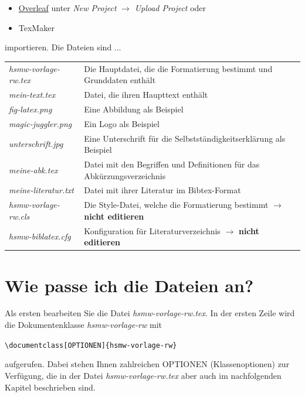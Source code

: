 \begin{itemize}
 \item \href{https://www.overleaf.com}{Overleaf} unter \textit{New Project} $\rightarrow$ \textit{Upload Project} oder
 \item TexMaker
\end{itemize}  
 
importieren. Die Dateien sind ...

\begin{tabular}{lp{}}
\textit{hsmw-vorlage-rw.tex} & Die Hauptdatei, die die Formatierung bestimmt und Grunddaten enthält \\
\textit{mein-text.tex} & Datei, die ihren Haupttext enthält \\
\textit{fig-latex.png} & Eine Abbildung als Beispiel\\
\textit{magic-juggler.png} & Ein Logo als Beispiel\\
\textit{unterschrift.jpg} & Eine Unterschrift für die Selbstständigkeitserklärung als Beispiel\\
\textit{meine-abk.tex} & Datei mit den Begriffen und Definitionen für das Abkürzungsverzeichnis\\
\textit{meine-literatur.txt} & Datei mit ihrer Literatur im Bibtex-Format\\
\textit{hsmw-vorlage-rw.cls} & Die Style-Datei, welche die Formatierung bestimmt $\rightarrow$ \textbf{nicht editieren}\\
\textit{hsmw-biblatex.cfg} & Konfiguration für Literaturverzeichnis  $\rightarrow$ \textbf{nicht editieren}\\
\end{tabular}

\section{Wie passe ich die Dateien an?}
Als ersten bearbeiten Sie die Datei \textit{hsmw-vorlage-rw.tex}. In der ersten Zeile wird die Dokumentenklasse \textit{hsmw-vorlage-rw} mit 

\verb+\documentclass[OPTIONEN]{hsmw-vorlage-rw}+ 

aufgerufen. Dabei stehen Ihnen zahlreichen OPTIONEN (Klassenoptionen) zur Verfügung, die in der Datei \textit{hsmw-vorlage-rw.tex} aber auch im nachfolgenden Kapitel beschrieben sind.



